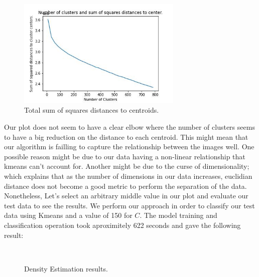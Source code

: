 \documentclass[11pt]{article}
\begin{document}
\begin{singlespace}
\begin{figure}[h]
    \centering
    \includegraphics[width=0.7\textwidth]{plots/den-est-valid2.jpg}
    \caption{Total sum of squares distances to centroids.}
\end{figure}

Our plot does not seem to have a clear elbow where the number of clusters seems to have a big reduction on the distance to each centroid. This might mean that our algorithm is failling to capture the relationship between the images well. One possible reason might be due to our data having a non-linear relationship that kmeans can't account for. Another might be due to the curse of dimensionality; which explains that as the number of dimensions in our data increases, euclidian distance does not become a good metric to perform the separation of the data. Nonetheless, Let's select an arbitrary middle value in our plot and evaluate our test data to see the results. We perform our approach in order to classify our test data using Kmeans and a value of 150 for $C$. The model training and classification operation took aproximitely 622 seconds and gave the following result:\\

\begin{figure}[h]
    \centering
    
     \\
    \caption{Density Estimation results.}
\end{figure} 


\end{singlespace}
\end{document}
